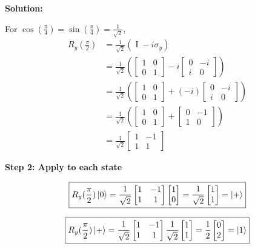 \documentclass[11pt]{article}
\newenvironment{solution}
{\par\noindent\textbf{Solution:}\par}
{\vspace{1em}}
\begin{document}
\begin{solution}
For $\cos(\frac{\pi}{4}) = \sin(\frac{\pi}{4}) = \frac{1}{\sqrt{2}}$,
\[\begin{aligned}
R_y(\frac{\pi}{2}) &= \frac{1}{\sqrt{2}}(\operatorname{I} - i\sigma_y) \\
&= \frac{1}{\sqrt{2}}\left(\begin{bmatrix}1 & 0 \\ 0 & 1\end{bmatrix} - i\begin{bmatrix}0 & -i \\ i & 0\end{bmatrix}\right) \\
&= \frac{1}{\sqrt{2}}\left(\begin{bmatrix}1 & 0 \\ 0 & 1\end{bmatrix} + (-i)\begin{bmatrix}0 & -i \\ i & 0\end{bmatrix}\right) \\
&= \frac{1}{\sqrt{2}}\left(\begin{bmatrix}1 & 0 \\ 0 & 1\end{bmatrix} + \begin{bmatrix}0 & -1 \\ 1 & 0\end{bmatrix}\right) \\
&= \frac{1}{\sqrt{2}}\begin{bmatrix}1 & -1 \\ 1 & 1\end{bmatrix}
\end{aligned}\]

\textbf{Step 2: Apply to each state}

\[\boxed{R_y(\frac{\pi}{2})\ket{0} = \frac{1}{\sqrt{2}}\begin{bmatrix}1 & -1 \\ 1 & 1\end{bmatrix}\begin{bmatrix}1 \\ 0\end{bmatrix} = \frac{1}{\sqrt{2}}\begin{bmatrix}1 \\ 1\end{bmatrix} = \ket{+}}\]

\[\boxed{R_y(\frac{\pi}{2})\ket{+} = \frac{1}{\sqrt{2}}\begin{bmatrix}1 & -1 \\ 1 & 1\end{bmatrix}\frac{1}{\sqrt{2}}\begin{bmatrix}1 \\ 1\end{bmatrix} = \frac{1}{2}\begin{bmatrix}0 \\ 2\end{bmatrix} = \ket{1}}\]


\end{solution}
\end{document}
